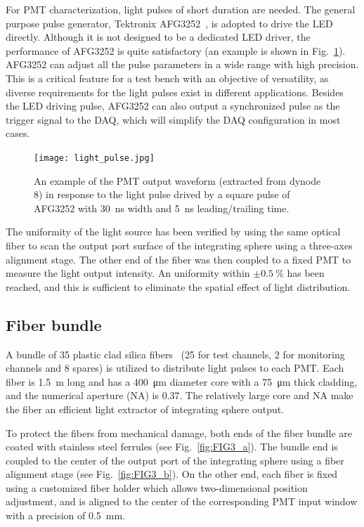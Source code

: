 \documentclass{nst}
\begin{document}
For PMT characterization, light pulses of short duration are needed.
The general purpose pulse generator, Tektronix AFG3252~\cite{afg3252}, is adopted to drive the LED directly.
Although it is not designed to be a dedicated LED driver, the performance of AFG3252 is quite satisfactory (an example is shown in Fig.~\ref{fig:light_pulse}).
AFG3252 can adjust all the pulse parameters in a wide range with high precision. This is a critical feature for a test bench with an objective of versatility, as diverse requirements for the light pulses exist in different applications. 
Besides the LED driving pulse, AFG3252 can also output a synchronized pulse as the trigger signal to the DAQ, which will simplify the DAQ configuration in most cases. 

\begin{figure}[!htb]
	\centering
	\texttt{[image: light\_pulse.jpg]}
	\caption{An example of the PMT output waveform (extracted from dynode 8) in response to the light pulse drived by a square pulse of AFG3252 with \SI{30}{\nano\second} width and \SI{5}{\nano\second} leading/trailing time.}
	\label{fig:light_pulse}
\end{figure} 

The uniformity of the light source has been verified by using the same optical fiber to scan the output port surface of the integrating sphere using a three-axes alignment stage. The other end of the fiber was then coupled to a fixed PMT to measure the light output intensity.
An uniformity within $\pm\SI{0.5}{\percent}$ has been reached, and this is sufficient to eliminate the spatial effect of light distribution.

\subsection{Fiber bundle}
\label{sec:fiber_bundle}

A bundle of 35 plastic clad silica fibers~\cite{optical_fibre} (25 for test channels, 2 for monitoring channels and 8 spares) is utilized to distribute light pulses to each PMT.	Each fiber is \SI{1.5}{\meter} long and has a \SI{400}{\micro\meter} diameter core with a \SI{75}{\micro\meter} thick cladding, and the numerical aperture (NA) is 0.37.
The relatively large core and NA make the fiber an efficient light extractor of integrating sphere output. 

To protect the fibers from mechanical damage, both ends of the fiber bundle are coated with stainless steel ferrules (see Fig.~\ref{fig:FIG3_a}).
The bundle end is coupled to the center of the output port of the integrating sphere using a fiber alignment stage (see Fig.~\ref{fig:FIG3_b}).
On the other end, each fiber is fixed using a customized fiber holder which allows two-dimensional position adjustment, and is aligned to the center of the corresponding PMT input window with a precision of \SI{0.5}{\milli\meter}.
\end{document}
